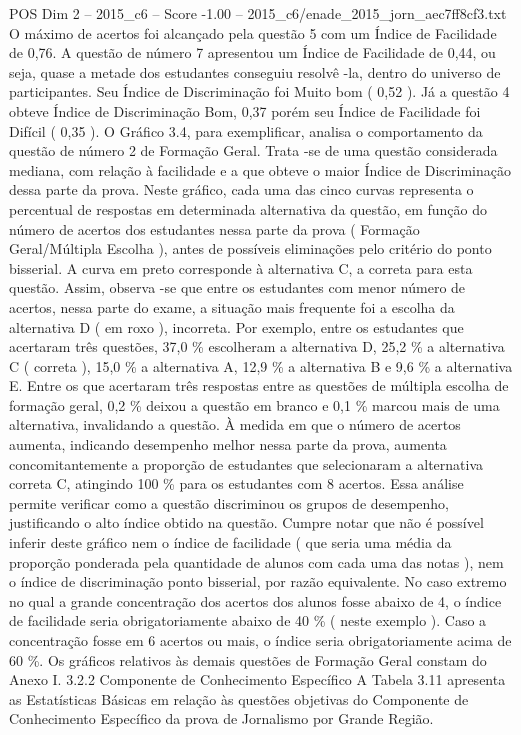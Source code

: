 \begin{textsample}{POS Dim 2 – 2015\_c6 – Score -1.00 – 2015\_c6/enade\_2015\_jorn\_aec7ff8cf3.txt}
O máximo de acertos foi alcançado pela questão 5 com um Índice de Facilidade de 0,76.
A questão de número 7 apresentou um Índice de Facilidade de 0,44, ou seja, quase a metade dos estudantes conseguiu resolvê -la, dentro do universo de participantes.
Seu Índice de Discriminação foi Muito bom ( 0,52 ).
Já a questão 4 obteve Índice de Discriminação Bom, 0,37 porém seu Índice de Facilidade foi Difícil ( 0,35 ).
O Gráfico 3.4, para exemplificar, analisa o comportamento da questão de número 2 de Formação Geral.
Trata -se de uma questão considerada mediana, com relação à facilidade e a que obteve o maior Índice de Discriminação dessa parte da prova.
Neste gráfico, cada uma das cinco curvas representa o percentual de respostas em determinada alternativa da questão, em função do número de acertos dos estudantes nessa parte da prova ( Formação Geral/Múltipla Escolha ), antes de possíveis eliminações pelo critério do ponto bisserial.
A curva em preto corresponde à alternativa C, a correta para esta questão.
Assim, observa -se que entre os estudantes com menor número de acertos, nessa parte do exame, a situação mais frequente foi a escolha da alternativa D ( em roxo ), incorreta.
Por exemplo, entre os estudantes que acertaram três questões, 37,0 \% escolheram a alternativa D, 25,2 \% a alternativa C ( correta ), 15,0 \% a alternativa A, 12,9 \% a alternativa B e 9,6 \% a alternativa E.
Entre os que acertaram três respostas entre as questões de múltipla escolha de formação geral, 0,2 \% deixou a questão em branco e 0,1 \% marcou mais de uma alternativa, invalidando a questão.
À medida em que o número de acertos aumenta, indicando desempenho melhor nessa parte da prova, aumenta concomitantemente a proporção de estudantes que selecionaram a alternativa correta C, atingindo 100 \% para os estudantes com 8 acertos.
Essa análise permite verificar como a questão discriminou os grupos de desempenho, justificando o alto índice obtido na questão.
Cumpre notar que não é possível inferir deste gráfico nem o índice de facilidade ( que seria uma média da proporção ponderada pela quantidade de alunos com cada uma das notas ), nem o índice de discriminação ponto bisserial, por razão equivalente.
No caso extremo no qual a grande concentração dos acertos dos alunos fosse abaixo de 4, o índice de facilidade seria obrigatoriamente abaixo de 40 \% ( neste exemplo ).
Caso a concentração fosse em 6 acertos ou mais, o índice seria obrigatoriamente acima de 60 \%.
Os gráficos relativos às demais questões de Formação Geral constam do Anexo I. 3.2.2 Componente de Conhecimento Específico A Tabela 3.11 apresenta as Estatísticas Básicas em relação às questões objetivas do Componente de Conhecimento Específico da prova de Jornalismo por Grande Região.

\end{textsample}
